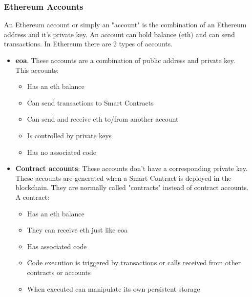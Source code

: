 \documentclass[a4paper, 12pt]{article} %
\begin{document}
        \subsubsection{Ethereum Accounts}
            An Ethereum account or simply an "account" is the combination of an Ethereum address and it's private key. An account can hold balance (\acrlong{eth}) and can send transactions. In Ethereum there are 2 types of accounts.
            \begin{itemize}
                \item \textbf{\acrfull{eoa}}. These accounts are a combination of public address and private key. This accounts:
                \begin{itemize}
                    \item Has an \acrlong{eth} balance
                    \item Can send transactions to Smart Contracts
                    \item Can send and receive \acrlong{eth} to/from another account
                    \item Is controlled by private keys
                    \item Has no associated code
                \end{itemize}
                \item \textbf{Contract accounts}: These accounts don't have a corresponding private key. These accounts are generated when a Smart Contract is deployed in the blockchain. They are normally called "contracts" instead of contract accounts. A contract:
                \begin{itemize}
                    \item Has an \acrlong{eth} balance
                    \item They can receive \acrlong{eth} just like \acrshort{eoa}
                    \item Has associated code
                    \item Code execution is triggered by transactions or calls received from other contracts or accounts
                    \item When executed can manipulate its own persistent storage
                \end{itemize}
            \end{itemize}
        
\end{document}
